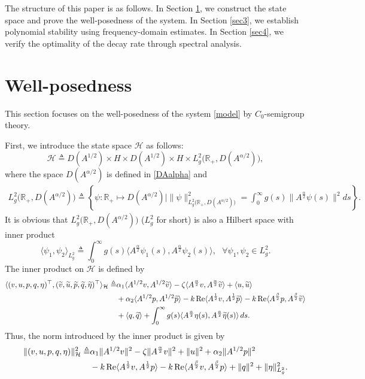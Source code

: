 \documentclass[12pt,reqno]{article}
\let\Section=\section
\def\section{\setcounter{equation}{0}\Section}
\begin{document}
The structure of this paper is as follows. In Section \ref{sec2}, we construct the state space and prove the well-posedness of the system. In Section \ref{sec3}, we establish polynomial stability using frequency-domain estimates. In Section \ref{sec4}, we verify the optimality of the decay rate through spectral analysis.
	\section{Well-posedness}\label{sec2}
	
	This section focuses on the well-posedness of the system \eqref{model} by $C_0$-semigroup theory.
	
	First, we introduce the state space $\mathcal{H}$ as follows:
	\[
	\mathcal{H} \triangleq D(A^{1/2}) \times H \times D(A^{1/2}) \times H \times L_g^2\big(\mathbb{R}_+, D(A^{{\alpha}/{2}})\big),
	\]
	where the space $D(A^{{\alpha}/{2}})$ is defined in \eqref{DAalpha} and
	\begin{align*}
		L_g^2\big(\mathbb{R}_+, D(A^{{\alpha}/{2}})\big)\triangleq\left\{\psi:\mathbb{R}_+\mapsto D(A^{{\alpha}/{2}})\bigg|\|\psi\|_{L_g^2\big(\mathbb{R}_+, D(A^{{\alpha}/{2}})\big)}^2=\int_0^\infty g(s)\|A^{\frac\alpha2}\psi(s)\|^2ds\right\}.
	\end{align*}
	It is obvious that $L_g^2\big(\mathbb{R}_+, D(A^{{\alpha}/{2}})\big)$ ($L_g^2$ for short) is also a Hilbert space with inner product
	\[\langle \psi_1,\psi_2\rangle_{L^2_g}\triangleq\int_0^\infty g(s)\langle A^{\frac\alpha 2}\psi_1(s), A^{\frac\alpha 2}\psi_2(s)\rangle,~~~\forall \psi_1,\psi_2\in L^2_g.\]
	The inner product on $\mathcal{H}$ is defined by
	\begin{align}\label{innerH}
		\langle (v,u,p,q,\eta)^\top , (\widetilde{v},\widetilde{u},\widetilde{p},\widetilde{q},\widetilde{\eta})^\top  \rangle_{\mathcal{H}}
		\triangleq& \alpha_1 \langle A^{1/2}v, A^{1/2}\widetilde{v} \rangle - \zeta \langle A^{\frac{\alpha}{2}}v, A^{\frac{\alpha}{2}}\widetilde{v} \rangle + \langle u,\widetilde{u} \rangle \notag\\
		&+ \alpha_2 \langle A^{1/2}p, A^{1/2}\widetilde{p} \rangle -k\operatorname{Re}\langle A^{\frac{1}{2}} v, A^{\frac{1}{2}}\widetilde p\rangle
		-k\operatorname{Re}\langle A^{\frac{\beta}{2}} p, A^{\frac{\beta}{2}} \widetilde v\rangle\notag\\
		&+ \langle q,\widetilde{q} \rangle + \int_0^\infty g(s) \langle A^{\frac{\alpha}{2}}\eta(s), A^{\frac{\alpha}{2}}\widetilde{\eta}(s) \rangle \, ds.
	\end{align}
	Thus, the norm introduced by the inner product is given by
	\begin{align}\label{normH}
		\|(v,u,p,q,\eta)\|_{\mathcal{H}}^2
		\triangleq& \alpha_1 \|A^{1/2}v\|^2 - \zeta\|A^{\frac{\alpha}{2}}v\|^2 + \|u\|^2+ \alpha_2 \|A^{1/2}p\|^2 \notag\\
		&- k \operatorname{Re} \langle A^{\frac{1}{2}} v, A^{\frac{1}{2}} p \rangle
		- k \operatorname{Re} \langle A^{\frac{\beta}{2}} v, A^{\frac{\beta}{2}} p \rangle+ \|q\|^2 + \|\eta\|_{L_g^2}^2.
	\end{align}
	
\end{document}
